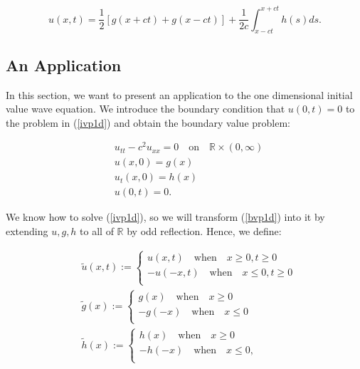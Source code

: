 \documentclass[12pt]{article}
\numberwithin{equation}{section}
\begin{document}
\begin{equation} \label{DAla}
    u(x,t)=\frac{1}{2}\left[g(x+ct)+g(x-ct)\right]+\frac{1}{2c}\int^{x+ct}_{x-ct}h(s)ds.
\end{equation}

\subsection{An Application} \label{anapplication}
In this section, we want to present an application to the one dimensional initial value wave equation. We introduce the boundary condition that
$u(0,t)=0$ to the problem in (\ref{ivp1d}) and obtain the boundary value problem:

\begin{equation} \label{bvp1d}
    \begin{aligned}
    &u_{tt}-c^2u_{xx}=0 \quad \textrm {on} \quad \mathbb{R} \times (0,\infty)\\
    &u(x,0)=g(x)\\
    &u_t(x,0)=h(x)\\
    &u(0,t)=0.
    \end{aligned}
\end{equation}

We know how to solve (\ref{ivp1d}), so we will transform (\ref{bvp1d}) into it by extending $u,g,h$ to all of $\mathbb{R}$ by odd reflection. \cite{Ev}
Hence, we define:

\begin{equation*}
    \begin{aligned}
        &\tilde{u}(x,t):=
        \begin{cases}
            u(x,t) \quad \textrm{when} \quad x \ge 0, t \ge 0\\
            -u(-x,t) \quad \textrm{when} \quad x \le 0, t \ge 0\\
        \end{cases}
        \\
        &\tilde{g}(x):=
        \begin{cases}
            g(x) \quad \textrm{when} \quad x \ge 0\\
            -g(-x) \quad \textrm{when} \quad x \le 0\\
        \end{cases}
        \\
        &\tilde{h}(x):=
        \begin{cases}
            h(x) \quad \textrm{when} \quad x \ge 0\\
            -h(-x) \quad \textrm{when} \quad x \le 0,\\
        \end{cases}
    \end{aligned}
\end{equation*}
\end{document}
